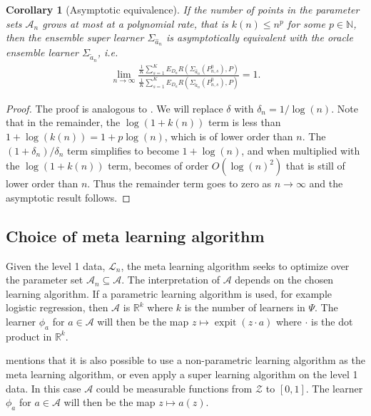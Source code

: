 \documentclass[11pt, a4paper]{article}
\newtheorem{corollary}[theorem]{Corollary}
\theoremstyle{definition}
\theoremstyle{remark}
\newcommand{\ml}{k}
\newcommand{\lib}{\Psi}
\newcommand{\lone}{\mathcal{L}}
\newcommand{\meta}{\phi}
\newcommand{\esl}{\Sigma}
\DeclareMathOperator{\expit}{expit}
\begin{document}
\begin{corollary}[Asymptotic equivalence] \label{cor:esl_asymptotic_equivalence}
    If the number of points in the parameter sets $ \mathcal{A}_n $ grows at most at a polynomial rate, that is $ k(n) \leq n^{p} $ for some $ p \in \mathbb{N} $, then the ensemble super learner $ \esl_{ \hat{a}_n } $ is asymptotically equivalent with the oracle ensemble learner $ \esl_{ \tilde{a}_n } $, i.e.
    \begin{align*}
        \lim_{n \to \infty} \frac{\frac{1}{K} \sum_{s = 1}^{K} E_{D_n} R(\esl_{ \hat{a}_n }(P_{n, s}^{0}) , P)}{\frac{1}{K} \sum_{s = 1}^{K} E_{D_n} R(\esl_{ \tilde{a}_n }(P_{n,s}^{0}), P)} = 1.
    \end{align*}
\end{corollary}
\begin{proof}
    The proof is analogous to . We will replace $ \delta $ with $ \delta_n = 1/ \log(n) $. Note that in the remainder, the $ \log(1 + k(n)) $ term is less than $ 1 + \log(k(n)) = 1 + p \log(n) $, which is of lower order than $ n $. The $(1 + \delta_n)/ \delta_n $ term simplifies to become $ 1 + \log(n) $, and when multiplied with the $ \log(1 + k(n)) $ term, becomes of order $ O(\log(n)^2) $ that is still of lower order than $ n $. Thus the remainder term goes to zero as $ n \to \infty $ and the asymptotic result follows. 
\end{proof}

\subsection{Choice of meta learning algorithm} \label{simplex}
Given the level 1 data, $ \lone_n $, the meta learning algorithm seeks to optimize over the parameter set $ \mathcal{A}_n \subseteq \mathcal{A} $. The interpretation of $ \mathcal{A} $ depends on the chosen learning algorithm. If a parametric learning algorithm is used, for example logistic regression, then $ \mathcal{A} $ is $ \mathbb{R}^{\ml} $ where $ \ml $ is the number of learners in $ \lib $. The learner $ \meta_a $ for $ a \in \mathcal{A} $ will then be the map $ z \mapsto \expit(z \cdot a) $ where $ \cdot $ is the dot product in $ \mathbb{R}^{\ml} $.

\citet{van2007super} mentions that it is also possible to use a non-parametric learning algorithm as the meta learning algorithm, or even apply a super learning algorithm on the level 1 data. In this case $ \mathcal{A} $ could be measurable functions from $ \mathcal{Z} $ to $ [0, 1] $. The learner $ \meta_a $ for $ a \in \mathcal{A} $ will then be the map $ z \mapsto a(z) $.
\end{document}
